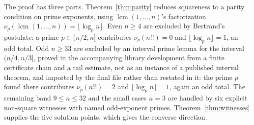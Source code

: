 \documentclass[11pt]{article}
\begin{document}
The proof has three parts. Theorem~\ref{thm:parity} reduces squareness to a parity
condition on prime exponents, using $\operatorname{lcm}(1,\dots,n)$'s factorization
$\nu_p(\operatorname{lcm}(1,\dots,n)) = \lfloor \log_p n \rfloor$. Even $n \geq 4$ are
excluded by Bertrand's postulate: a prime $p \in (n/2, n]$ contributes $\nu_p(n!!) = 0$ and
$\lfloor \log_p n \rfloor = 1$, an odd total. Odd $n \geq 33$ are excluded by an interval
prime lemma for the interval $(n/4, n/3]$, proved in the accompanying
library development from a finite
certificate chain and a tail estimate, not as an instance of a published interval
theorem, and imported by the final file rather than restated in it: the prime $p$ found there contributes $\nu_p(n!!) = 2$ and
$\lfloor \log_p n \rfloor = 1$, again an odd total. The remaining band $9 \leq n \leq 32$ and
the small cases $n = 3$ are handled by six explicit non-square witnesses with named
odd-exponent primes. Theorem~\ref{thm:witnesses} supplies the five solution points, which
gives the converse direction.
\end{document}
